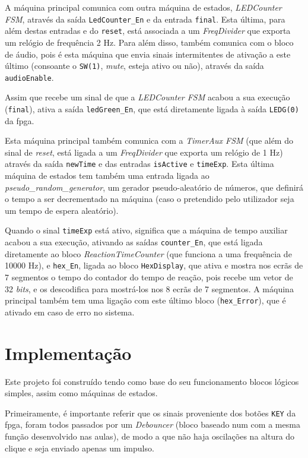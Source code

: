 \documentclass[a4paper,11pt,onecolumn]{report}
\begin{document}
A máquina principal comunica com outra máquina de estados, \textit{LEDCounter FSM}, através da saída \texttt{LedCounter\_En} e da entrada \texttt{final}. Esta última, para além destas entradas e do \texttt{reset}, está associada a um \textit{FreqDivider} que exporta um relógio de frequência 2 Hz. Para além disso, também comunica com o bloco de áudio, pois é esta máquina que envia sinais intermitentes de ativação a este último (consoante o \texttt{SW(1)}, \textit{mute}, esteja ativo ou não), através da saída \texttt{audioEnable}.

Assim que recebe um sinal de que a \textit{LEDCounter FSM} acabou a sua execução (\texttt{final}), ativa a saída \texttt{ledGreen\_En}, que está diretamente ligada à saída \texttt{LEDG(0)} da \ac{fpga}.

Esta máquina principal também comunica com a \textit{TimerAux FSM} (que além do sinal de \textit{reset}, está ligada a um \textit{FreqDivider} que exporta um relógio de 1 Hz) através da saída \texttt{newTime} e das entradas \texttt{isActive} e \texttt{timeExp}. Esta última máquina de estados tem também uma entrada ligada ao \textit{pseudo\_random\_generator}, um gerador pseudo-aleatório de números, que definirá o tempo a ser decrementado na máquina (caso o pretendido pelo utilizador seja um tempo de espera aleatório).

Quando o sinal \texttt{timeExp} está ativo, significa que a máquina de tempo auxiliar acabou a sua execução, ativando as saídas \texttt{counter\_En}, que está ligada diretamente ao bloco \textit{ReactionTimeCounter} (que funciona a uma frequência de 10000 Hz), e \texttt{hex\_En}, ligada ao bloco \texttt{HexDisplay}, que ativa e mostra nos ecrãs de 7 segmentos o tempo do contador do tempo de reação, pois recebe um vetor de 32 \textit{bits}, e os descodifica para mostrá-los nos 8 ecrãs de 7 segmentos. A máquina principal também tem uma ligação com este último bloco (\texttt{hex\_Error}), que é ativado em caso de erro no sistema.

\section{Implementação}

Este projeto foi construído tendo como base do seu funcionamento blocos lógicos simples, assim como máquinas de estados.

Primeiramente, é importante referir que os sinais proveniente dos botões \texttt{KEY} da \ac{fpga}, foram todos passados por um \textit{Debouncer} (bloco baseado num com a mesma função desenvolvido nas aulas), de modo a que não haja oscilações na altura do clique e seja enviado apenas um impulso.
\end{document}
